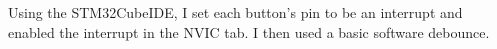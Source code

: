 Using the STM32CubeIDE, I set each button's pin to be an interrupt and enabled the interrupt in the NVIC tab. I then used a basic software debounce.